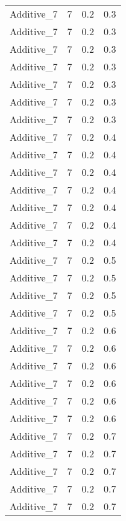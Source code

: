 \documentclass{article}
\begin{document}
\begin{longtable}[H]{lrrr}
 Additive\_7 &       7 &   0.2 &            0.3 \\
 Additive\_7 &       7 &   0.2 &            0.3 \\
 Additive\_7 &       7 &   0.2 &            0.3 \\
 Additive\_7 &       7 &   0.2 &            0.3 \\
 Additive\_7 &       7 &   0.2 &            0.3 \\
 Additive\_7 &       7 &   0.2 &            0.3 \\
 Additive\_7 &       7 &   0.2 &            0.3 \\
 Additive\_7 &       7 &   0.2 &            0.4 \\
 Additive\_7 &       7 &   0.2 &            0.4 \\
 Additive\_7 &       7 &   0.2 &            0.4 \\
 Additive\_7 &       7 &   0.2 &            0.4 \\
 Additive\_7 &       7 &   0.2 &            0.4 \\
 Additive\_7 &       7 &   0.2 &            0.4 \\
 Additive\_7 &       7 &   0.2 &            0.4 \\
 Additive\_7 &       7 &   0.2 &            0.5 \\
 Additive\_7 &       7 &   0.2 &            0.5 \\
 Additive\_7 &       7 &   0.2 &            0.5 \\
 Additive\_7 &       7 &   0.2 &            0.5 \\
 Additive\_7 &       7 &   0.2 &            0.6 \\
 Additive\_7 &       7 &   0.2 &            0.6 \\
 Additive\_7 &       7 &   0.2 &            0.6 \\
 Additive\_7 &       7 &   0.2 &            0.6 \\
 Additive\_7 &       7 &   0.2 &            0.6 \\
 Additive\_7 &       7 &   0.2 &            0.6 \\
 Additive\_7 &       7 &   0.2 &            0.7 \\
 Additive\_7 &       7 &   0.2 &            0.7 \\
 Additive\_7 &       7 &   0.2 &            0.7 \\
 Additive\_7 &       7 &   0.2 &            0.7 \\
 Additive\_7 &       7 &   0.2 &            0.7 \\

\end{longtable}
\end{document}
